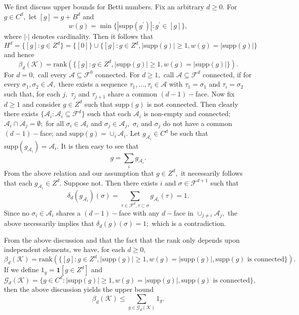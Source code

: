 \documentclass[12pt]{amsart}
\numberwithin{equation}{section}
\numberwithin{theorem}{section}
\newcommand{\A}{\mathcal{A}}
\newcommand{\cobdr}{\delta}
\newcommand{\1}{\mathbf{1}}
\def\F{\mathcal{F}}
\def\K{\mathcal{K}}
\def\G{\mathcal{G}}
\def\rank{\mathrm{rank}}
\def\supp{\mathrm{supp}}
\begin{document}
We first discuss upper bounds for Betti numbers. Fix an arbitrary $d \geq 0.$ For $g \in C^d,$ let $[g] = g + B^{d}$	and
%
\begin{equation}
\label{eqn:wtg}
w(g) = \min\{|\supp(g^\prime)| : g^\prime \in [g]\},
\end{equation}
where $|\cdot|$ denotes cardinality. Then it follows that
\[
H^d = \{[g]: g \in Z^d\} = \{[0]\} \cup \{[g]: g \in Z^d, |\supp(g)| \geq 1, w(g) = |\supp(g)|\}
\]
and hence
\begin{equation}
\label{eqn:BetaRel}
\beta_d(\K) = \rank(\{[g]: g \in Z^d, |\supp(g)| \geq 1, w(g) = |\supp(g)|\}).
\end{equation}
%
For $d = 0,$ call every $\A \subseteq \F^0$ connected. For $d \geq 1,$ call $\A \subseteq \F^d$ connected, if for every $\sigma_1, \sigma_2 \in \A,$ there exists a sequence $\tau_1, \ldots, \tau_i \in \A$ with $\tau_1 = \sigma_1$ and $\tau_i = \sigma_2$ such that, for each $j,$ $\tau_j$ and $\tau_{j + 1}$ share a common $(d - 1)-$face. Now fix $d \geq 1$ and consider $g \in Z^d$ such that $\supp(g)$ is not connected. Then clearly there exists $\{\A_i : \A_i \subseteq \F^d\}$ such that each $\A_i$ is non-empty and connected; $\A_i \cap \A_j = \emptyset;$  for all $\sigma_i \in \A_i$ and $\sigma_j \in \A_j,$ $\sigma_i$ and $\sigma_j$ do not have a common $(d - 1)-$face;  and $\supp(g) = \cup_{i}\A_i.$ Let $g_{\A_i} \in C^d$ be such that $\supp(g_{\A_i}) = \A_i.$ It is then easy to see that
\[
g = \sum_i g_{\A_i}.
\]
%
From the above relation and our assumption that $g \in Z^d,$ it necessarily follows that each $g_{\A_i} \in Z^d.$ Suppose not. Then there exists $i$ and $\sigma \in \F^{d + 1}$ such that
\[
\cobdr_d(g_{\A_i})(\sigma) = \sum_{\tau \in \F^d, \tau \subset \sigma} g_{\A_i}(\tau) = 1.
\]
%
Since no $\sigma_i \in \A_i$ shares a $(d - 1)-$face with any $d-$face in $\cup_{j \neq i} \A_j,$  the above necessarily implies that $\cobdr_d(g)(\sigma) = 1;$ which is a contradiction.

From the above discussion and that the fact that the rank only depends upon independent elements, we have, for each $d \geq 0,$
\[
\beta_d(\K) = \rank(\{[g]: g \in Z^d, |\supp(g)| \geq 1, w(g) = |\supp(g)|, \supp(g) \text{ is connected}\}).
\]
If we define $1_{g} = \1[g \in Z^d]$ and
%
\begin{equation}
\label{eqn:G_Defn}
\G_d(\K) = \{g \in C^d: |\supp(g)| \geq 1, w(g) = |\supp(g)|, \supp(g) \text{ is connected}\},
\end{equation}
then the above discussion yields the upper bound
\begin{equation}
\label{eqn:Upp_Bd_Betti_d}
\beta_{d}(\K) \leq \sum_{g \in \G_d(\K)} 1_g.
\end{equation}
\end{document}
